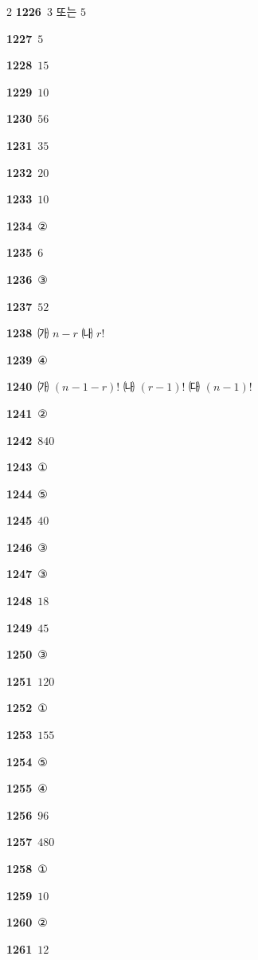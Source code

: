 \documentclass[10pt,a4paper]{article}
\begin{document}
\begin{multicols}{2}
\noindent\textbf{1226}\ $3$ 또는 $5$\par
\noindent\textbf{1227}\ $5$\par
\noindent\textbf{1228}\ $15$\par
\noindent\textbf{1229}\ $10$\par
\noindent\textbf{1230}\ $56$\par
\noindent\textbf{1231}\ $35$\par
\noindent\textbf{1232}\ $20$\par
\noindent\textbf{1233}\ $10$\par
\noindent\textbf{1234}\ ②\par
\noindent\textbf{1235}\ $6$\par
\noindent\textbf{1236}\ ③\par
\noindent\textbf{1237}\ $52$\par
\noindent\textbf{1238}\ ㈎ $n-r$ \quad ㈏ $r!$\par
\noindent\textbf{1239}\ ④\par
\noindent\textbf{1240}\ ㈎ $(n-1-r)!$ \quad ㈏ $(r-1)!$ \quad ㈐ $(n-1)!$\par
\noindent\textbf{1241}\ ②\par
\noindent\textbf{1242}\ $840$\par
\noindent\textbf{1243}\ ①\par
\noindent\textbf{1244}\ ⑤\par
\noindent\textbf{1245}\ $40$\par
\noindent\textbf{1246}\ ③\par
\noindent\textbf{1247}\ ③\par
\noindent\textbf{1248}\ $18$\par
\noindent\textbf{1249}\ $45$\par
\noindent\textbf{1250}\ ③\par
\noindent\textbf{1251}\ $120$\par
\noindent\textbf{1252}\ ①\par
\noindent\textbf{1253}\ $155$\par
\noindent\textbf{1254}\ ⑤\par
\noindent\textbf{1255}\ ④\par
\noindent\textbf{1256}\ $96$\par
\noindent\textbf{1257}\ $480$\par
\noindent\textbf{1258}\ ①\par
\noindent\textbf{1259}\ $10$\par
\noindent\textbf{1260}\ ②\par
\noindent\textbf{1261}\ $12$\par

\end{multicols}
\end{document}
